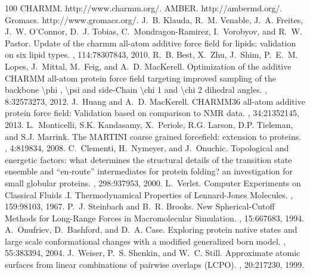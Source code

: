 \documentclass[a4paper,11pt,oneside,english]{sphinxmanual}
\begin{document}
\begin{sphinxthebibliography}{100}
CHARMM. http://www.charmm.org/.
AMBER. http://ambermd.org/.
Gromacs. http://www.gromacs.org/.
J. B. Klauda, R. M. Venable, J. A. Freites, J. W. O’Connor, D. J. Tobias, C. Mondragon-Ramirez, I. Vorobyov, and R. W. Pastor. Update of the charmm all-atom additive force field for lipids: validation on six lipid types. , 114:7830\textendash{}7843, 2010.
R. B. Best, X. Zhu, J. Shim, P. E. M. Lopes, J. Mittal, M. Feig, and A. D. MacKerell. Optimization of the additive CHARMM all-atom protein force field targeting improved sampling of the backbone \textbackslash{}phi , \textbackslash{}psi and side-Chain \textbackslash{}chi 1 and \textbackslash{}chi 2 dihedral angles. , 8:3257\textendash{}3273, 2012.
J. Huang and A. D. MacKerell. CHARMM36 all-atom additive protein force field: Validation based on comparison to NMR data. , 34:2135\textendash{}2145, 2013.
L. Monticelli, S.K. Kandasamy, X. Periole, R.G. Larson, D.P. Tieleman, and S.J. Marrink. The MARTINI coarse grained forcefield: extension to proteins. , 4:819\textendash{}834, 2008.
C. Clementi, H. Nymeyer, and J. Onuchic. Topological and energetic factors: what determines the structural details of the transition state ensemble and “en-route” intermediates for protein folding? an investigation for small globular proteins. , 298:937\textendash{}953, 2000.
L. Verlet. Computer Experiments on Classical Fluids .I. Thermodynamical Properties of Lennard-Jones Molecules. , 159:98\textendash{}103, 1967.
P. J. Steinbach and B. R. Brooks. New Spherical-Cutoff Methods for Long-Range Forces in Macromolecular Simulation. , 15:667\textendash{}683, 1994.
A. Onufriev, D. Bashford, and D. A. Case. Exploring protein native states and large scale conformational changes with a modified generalized born model. , 55:383\textendash{}394, 2004.
J. Weiser, P. S. Shenkin, and W. C. Still. Approximate atomic surfaces from linear combinations of pairwise overlaps (LCPO). , 20:217\textendash{}230, 1999.

\end{sphinxthebibliography}
\end{document}
